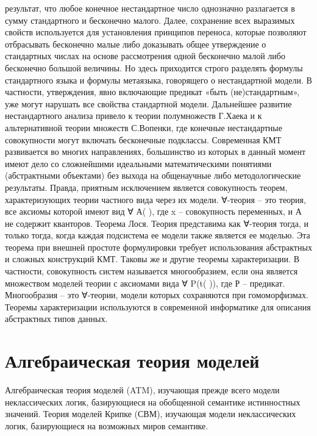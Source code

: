 \documentclass[12pt, a4paper]{article}
\begin{document}
результат, что любое конечное нестандартное число однозначно разлагается в сумму стандартного и
бесконечно малого. Далее, сохранение всех выразимых свойств используется для установления
принципов переноса, которые позволяют отбрасывать бесконечно малые либо доказывать общее
утверждение о стандартных числах на основе рассмотрения одной бесконечно малой либо бесконечно
большой величины. Но здесь приходится строго разделять формулы стандартного языка и формулы
метаязыка, говорящего о нестандартной модели. В частности, утверждения, явно включающие
предикат «быть (не)стандартным», уже могут нарушать все свойства стандартной модели. Дальнейшее
развитие нестандартного анализа привело к теории полумножеств Г.Хаека и к альтернативной теории
множеств С.Вопенки, где конечные нестандартные совокупности могут включать бесконечные
подклассы.
Современная КМТ развивается во многих направлениях, большинство из которых в данный момент
имеют дело со сложнейшими идеальными математическими понятиями (абстрактными объектами)
без выхода на общенаучные либо методологические результаты. Правда, приятным исключением
является совокупность теорем, характеризующих теории частного вида через их модели. ∀-теория –
это теория, все аксиомы которой имеют вид ∀ А( ), где x – совокупность переменных, и А не
содержит кванторов.
Теорема Лося. Теория представима как ∀-теория тогда, и только тогда, когда каждая подсистема ее
модели также является ее моделью.
Эта теорема при внешней простоте формулировки требует использования абстрактных и сложных
конструкций КМТ. Таковы же и другие теоремы характеризации. В частности, совокупность систем
называется многообразием, если она является множеством моделей теории с аксиомами вида ∀ P(t(
)), где Р – предикат. Многообразия – это ∀-теории, модели которых сохраняются при гомоморфизмах.
Теоремы характеризации используются в современной информатике для описания абстрактных типов
данных.

\section{Алгебраическая теория моделей}

Алгебраическая теория моделей (ATM), изучающая прежде всего модели неклассических логик,
базирующиеся на обобщенной семантике истинностных значений. Теория моделей Крипке (СВМ),
изучающая модели неклассических логик, базирующиеся на возможных миров семантике.
\end{document}
